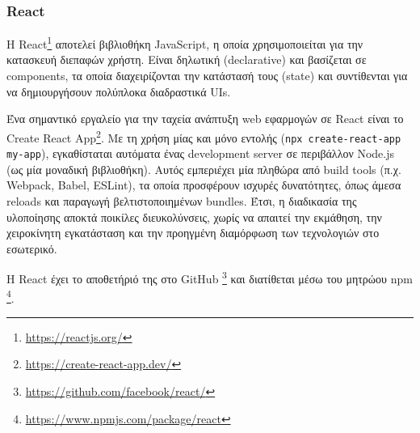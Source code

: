 \subsubsection{React} \label{subsection:4-2-2-1-react}


Η React\footnote{\url{https://reactjs.org/}} αποτελεί βιβλιοθήκη JavaScript, η οποία χρησιμοποιείται για την κατασκευή διεπαφών χρήστη. Είναι δηλωτική (declarative) και βασίζεται σε components, τα οποία διαχειρίζονται την κατάστασή τους (state) και συντίθενται για να δημιουργήσουν πολύπλοκα διαδραστικά UIs.

Ένα σημαντικό εργαλείο για την ταχεία ανάπτυξη web εφαρμογών σε React είναι το Create React App\footnote{\url{https://create-react-app.dev/}}. Με τη χρήση μίας και μόνο εντολής (\texttt{npx create-react-app my-app}), εγκαθίσταται αυτόματα ένας development server σε περιβάλλον Node.js (ως μία μοναδική βιβλιοθήκη). Αυτός εμπεριέχει μία πληθώρα από build tools (π.χ. Webpack, Babel, ESLint), τα οποία προσφέρουν ισχυρές δυνατότητες, όπως άμεσα reloads και παραγωγή βελτιστοποιημένων bundles. Έτσι, η διαδικασία της υλοποίησης αποκτά ποικίλες διευκολύνσεις, χωρίς να απαιτεί την εκμάθηση, την χειροκίνητη εγκατάσταση και την προηγμένη διαμόρφωση των τεχνολογιών στο εσωτερικό. 

Η React έχει το αποθετήριό της στο GitHub \footnote{\url{https://github.com/facebook/react/}} και διατίθεται μέσω του μητρώου npm \footnote{\url{https://www.npmjs.com/package/react}}.
